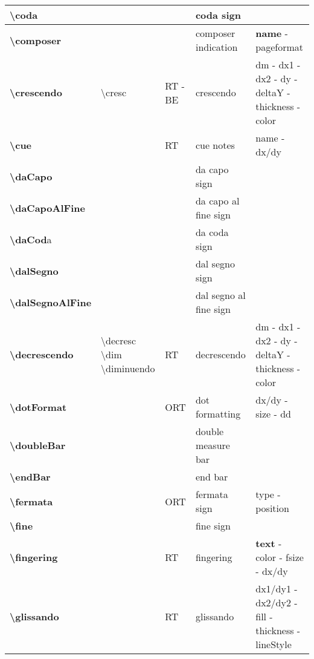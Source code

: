 \documentclass[a4paper, landscape, 10pt]{article}
\begin{document}
\begin{tabularx}{\linewidth}{p{3cm}p{4.5cm}p{3cm}p{5.5cm}l}
    \hline
    \textbf{\textbackslash{}coda}&&&coda sign&\\
    \hline
    \textbf{\textbackslash{}composer}&&&composer indication&\textbf{name} - pageformat\\
    \hline
    \textbf{\textbackslash{}crescendo}&\textbackslash{}cresc&RT - BE&crescendo&dm - dx1 - dx2 - dy - deltaY - thickness - color\\
    \hline
    \textbf{\textbackslash{}cue}&&RT&cue notes&name - dx/dy\\
    \hline
    \textbf{\textbackslash{}daCapo}&&&da capo sign&\\
    \hline
    \textbf{\textbackslash{}daCapoAlFine}&&&da capo al fine sign&\\
    \hline
    \textbf{\textbackslash{}daCod}a&&&da coda sign&\\
    \hline
    \textbf{\textbackslash{}dalSegno}&&&dal segno sign&\\
    \hline
    \textbf{\textbackslash{}dalSegnoAlFine}&&&dal segno al fine sign&\\
    \hline
    \textbf{\textbackslash{}decrescendo}&\textbackslash{}decresc \textbackslash{}dim \textbackslash{}diminuendo&RT&decrescendo&dm - dx1 - dx2 - dy - deltaY - thickness - color\\
    \hline
    \textbf{\textbackslash{}dotFormat}&&ORT&dot formatting&dx/dy - size - dd\\
    \hline
    \textbf{\textbackslash{}doubleBar}&&&double measure bar&\\
    \hline
    \textbf{\textbackslash{}endBar}&&&end bar&\\
    \hline
    \textbf{\textbackslash{}fermata}&&ORT&fermata sign&type - position\\
    \hline
    \textbf{\textbackslash{}fine}&&&fine sign&\\
    \hline
    \textbf{\textbackslash{}fingering}&&RT&fingering&\textbf{text} - color - fsize - dx/dy\\
    \hline
    \textbf{\textbackslash{}glissando}&&RT&glissando&dx1/dy1 - dx2/dy2 - fill - thickness - lineStyle\\
    \hline

\end{tabularx}
\end{document}
